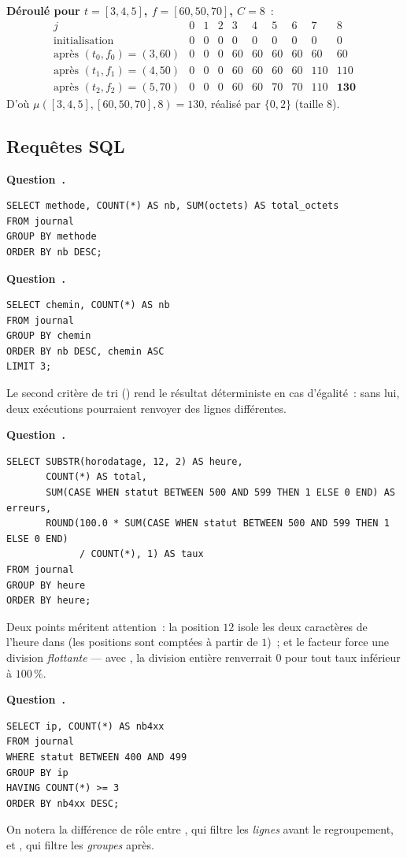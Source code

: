 \documentclass[11pt,a4paper]{article}
\renewcommand{\Q}{\medskip\par\stepcounter{qcnt}\noindent\textbf{\color{cnc}Question~\theqcnt.}~}
\begin{document}
\textbf{Déroulé pour $t=[3,4,5]$, $f=[60,50,70]$, $C=8$}~:
\[
\begin{array}{l|ccccccccc}
j & 0&1&2&3&4&5&6&7&8\\\hline
\text{initialisation} & 0&0&0&0&0&0&0&0&0\\
\text{après } (t_0,f_0)=(3,60) & 0&0&0&60&60&60&60&60&60\\
\text{après } (t_1,f_1)=(4,50) & 0&0&0&60&60&60&60&110&110\\
\text{après } (t_2,f_2)=(5,70) & 0&0&0&60&60&70&70&110&\mathbf{130}
\end{array}
\]
D'où $\mu([3,4,5],[60,50,70],8)=\boxed{130}$, réalisé par $\{0,2\}$ (taille $8$).

\subsection*{Requêtes SQL}

\Q
\begin{lstlisting}[style=sql]
SELECT methode, COUNT(*) AS nb, SUM(octets) AS total_octets
FROM journal
GROUP BY methode
ORDER BY nb DESC;
\end{lstlisting}

\Q
\begin{lstlisting}[style=sql]
SELECT chemin, COUNT(*) AS nb
FROM journal
GROUP BY chemin
ORDER BY nb DESC, chemin ASC
LIMIT 3;
\end{lstlisting}
Le second critère de tri () rend le résultat déterministe en cas d'égalité~:
sans lui, deux exécutions pourraient renvoyer des lignes différentes.

\Q
\begin{lstlisting}[style=sql]
SELECT SUBSTR(horodatage, 12, 2) AS heure,
       COUNT(*) AS total,
       SUM(CASE WHEN statut BETWEEN 500 AND 599 THEN 1 ELSE 0 END) AS erreurs,
       ROUND(100.0 * SUM(CASE WHEN statut BETWEEN 500 AND 599 THEN 1 ELSE 0 END)
             / COUNT(*), 1) AS taux
FROM journal
GROUP BY heure
ORDER BY heure;
\end{lstlisting}
Deux points méritent attention~: la position $12$ isole les deux caractères de l'heure dans
 (les positions sont comptées à partir de $1$)~; et le facteur
 force une division \emph{flottante} — avec , la division entière
renverrait $0$ pour tout taux inférieur à $100\,\%$.

\Q
\begin{lstlisting}[style=sql]
SELECT ip, COUNT(*) AS nb4xx
FROM journal
WHERE statut BETWEEN 400 AND 499
GROUP BY ip
HAVING COUNT(*) >= 3
ORDER BY nb4xx DESC;
\end{lstlisting}
On notera la différence de rôle entre , qui filtre les \emph{lignes} avant le
regroupement, et , qui filtre les \emph{groupes} après.
\end{document}
